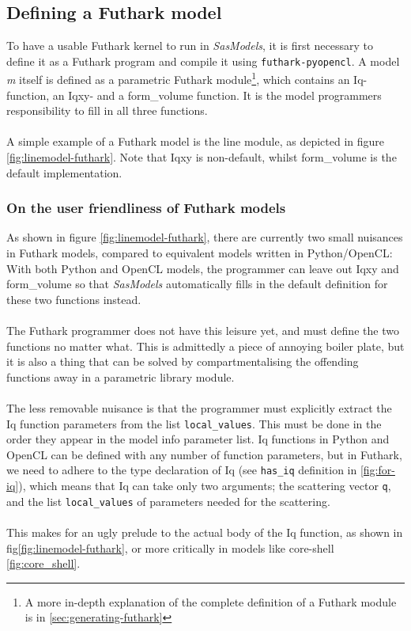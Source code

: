 \documentclass[11pt]{article}
\newcommand{\sasmodels}{\textit{SasModels}}
\begin{document}
\subsection{Defining a Futhark model}
\label{sec:defining-futhark-model}
To have a usable Futhark kernel to run in \sasmodels, it is first necessary to
define it as a Futhark program and compile it using \texttt{futhark-pyopencl}.
A model \textit{m} itself is defined as a parametric Futhark module\footnote{
  A more in-depth explanation of the complete definition of a Futhark module is 
  in \ref{sec:generating-futhark}},
which contains an Iq-function, an Iqxy- and a form\_volume function.
It is the model programmers responsibility to fill in all three functions.
\\\\
A simple example of a Futhark model is the line module, 
as depicted in figure \ref{fig:linemodel-futhark}.
Note that Iqxy is non-default, whilst form\_volume is the default 
implementation.

\subsubsection{On the user friendliness of Futhark models}
As shown in figure \ref{fig:linemodel-futhark}, there are currently two small 
nuisances in Futhark models, compared to equivalent models written in
Python/OpenCL:
\\
With both Python and OpenCL models, the programmer can leave out Iqxy and 
form\_volume so that \sasmodels{} automatically fills in the default definition
for these two functions instead.
\\\\
The Futhark programmer does not have this leisure yet, and must define the two
functions no matter what. This is admittedly a piece of annoying boiler plate,
but it is also a thing that can be solved by compartmentalising the offending
functions away in a parametric library module.
\\\\
The less removable nuisance is that the programmer must explicitly extract the
Iq function parameters from the list \texttt{local\_values}. This must be done
in the order they appear in the model info parameter list.
Iq functions in Python and OpenCL can be defined with any number of function 
parameters, but in Futhark, we need to adhere to the type declaration of Iq 
(see \texttt{has\_iq} definition in \ref{fig:for-iq}), which means that Iq can 
take only two arguments; the scattering vector \texttt{q}, and the list 
\texttt{local\_values} of parameters needed for the scattering.
\\\\
This makes for an ugly prelude to the actual body of the Iq function, as shown
in fig\ref{fig:linemodel-futhark}, or more critically in models like 
core-shell \ref{fig:core_shell}.
\end{document}
